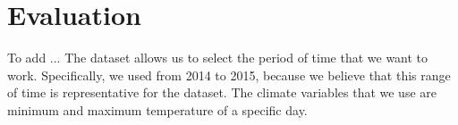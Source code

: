 

\section{Evaluation}
\label{sec:evaluation}
To add ...
The dataset allows us to select the period of time that we want to work. Specifically, we used from 2014 to 2015, because we believe that this range of time is representative for the dataset. The climate variables that we use are minimum and maximum temperature of a specific day.